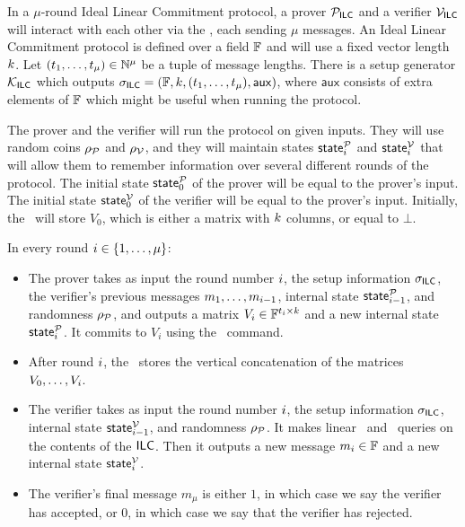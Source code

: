 \begin{definition}

In a $\mu$-round Ideal Linear Commitment protocol, a prover $\mathcal{P}_{\mathsf{ILC}}$ and a verifier $\mathcal{V}_{\mathsf{ILC}}$ will interact with each other via the \ILC, each sending $\mu$ messages. An Ideal Linear Commitment protocol is defined over a field $\mathbb{F}$ and will use a fixed vector length $k$. Let $(t_1,\ldots,t_\mu) \in \mathbb{N}^\mu$ be a tuple of message lengths. There is a setup generator $\mathcal{K}_{\mathsf{ILC}}$ which outputs $\mathsf{\sigma}_{\mathsf{ILC}} = (\mathbb{F},k,(t_1,\ldots,t_\mu),\mathsf{aux})$, where $\mathsf{aux}$ consists of extra elements of $\mathbb{F}$ which might be useful when running the protocol.

The prover and the verifier will run the protocol on given inputs. They will use random coins $\rho_{\mathcal{P}}$ and $\rho_{\mathcal{V}}$, and they will maintain states $\mathsf{state}^{\mathcal{P}}_i$ and $\mathsf{state}^{\mathcal{V}}_i$ that will allow them to remember information over several different rounds of the protocol. The initial state $\mathsf{state}^{\mathcal{P}}_0$ of the prover will be equal to the prover's input. The initial state $\mathsf{state}^{\mathcal{V}}_0$ of the verifier will be equal to the prover's input. Initially, the \ILC\ will store $V_0$, which is either a matrix with $k$ columns, or equal to $\bot$.

In every round $i \in \{ 1,\ldots,\mu \}$:
\begin{itemize}
\item The prover takes as input the round number $i$, the setup information $\mathsf{\sigma}_{\mathsf{ILC}}$, the verifier's previous messages $m_1,\ldots,m_{i-1}$, internal state $\mathsf{state}^{\mathcal{P}}_{i-1}$, and randomness $\rho_{\mathcal{P}}$, and outputs a matrix $V_i \in \mathbb{F}^{t_i \times k}$ and a new internal state $\mathsf{state}^{\mathcal{P}}_{i}$. It commits to $V_i$ using the \ILCcommit\ command.
\item After round $i$, the \ILC \ stores the vertical concatenation of the matrices $V_0,\ldots,V_i$.
\item The verifier takes as input the round number $i$, the setup information $\mathsf{\sigma}_{\mathsf{ILC}}$, internal state $\mathsf{state}^{\mathcal{V}}_{i-1}$, and randomness $\rho_{\mathcal{P}}$. It makes linear \ILCopen\ and \ILCcheck\ queries on the contents of the $\mathsf{ILC}$. Then it outputs a new message $m_i \in \mathbb{F}$ and a new internal state $\mathsf{state}_i^{\mathcal{V}}$.
\item The verifier's final message $m_\mu$ is either $1$, in which case we say the verifier has accepted, or $0$, in which case we say that the verifier has rejected.
\end{itemize}
\end{definition}

